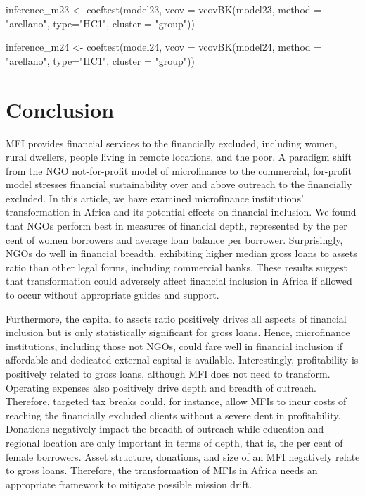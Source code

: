 \documentclass[a4paper,nobind]{templates/ociamthesis}
\newenvironment{Shaded}{\begin{snugshade}}{\end{snugshade}}
\newcommand{\AttributeTok}[1]{\textcolor[rgb]{0.77,0.63,0.00}{#1}}
\newcommand{\FunctionTok}[1]{\textcolor[rgb]{0.00,0.00,0.00}{#1}}
\newcommand{\NormalTok}[1]{#1}
\newcommand{\OtherTok}[1]{\textcolor[rgb]{0.56,0.35,0.01}{#1}}
\newcommand{\StringTok}[1]{\textcolor[rgb]{0.31,0.60,0.02}{#1}}
\renewenvironment{Shaded}
{
  \vspace{10pt}%
  \begin{snugshade}%
}{%
  \end{snugshade}%
  \vspace{8pt}%
}
\begin{document}
\begin{Shaded}
\begin{Highlighting}[]
\NormalTok{inference\_m23 }\OtherTok{\textless{}{-}} \FunctionTok{coeftest}\NormalTok{(model23, }\AttributeTok{vcov =} \FunctionTok{vcovBK}\NormalTok{(model23, }\AttributeTok{method =} \StringTok{"arellano"}\NormalTok{, }\AttributeTok{type=}\StringTok{"HC1"}\NormalTok{, }\AttributeTok{cluster =} \StringTok{"group"}\NormalTok{))}

\NormalTok{inference\_m24 }\OtherTok{\textless{}{-}} \FunctionTok{coeftest}\NormalTok{(model24, }\AttributeTok{vcov =} \FunctionTok{vcovBK}\NormalTok{(model24, }\AttributeTok{method =} \StringTok{"arellano"}\NormalTok{, }\AttributeTok{type=}\StringTok{"HC1"}\NormalTok{, }\AttributeTok{cluster =} \StringTok{"group"}\NormalTok{))}
\end{Highlighting}
\end{Shaded}

\hypertarget{conclusion}{%
\section{\texorpdfstring{\textbf{Conclusion}}{Conclusion}}\label{conclusion}}

MFI provides financial services to the financially excluded, including women, rural dwellers, people living in remote locations, and the poor. A paradigm shift from the NGO not-for-profit model of microfinance to the commercial, for-profit model stresses financial sustainability over and above outreach to the financially excluded. In this article, we have examined microfinance institutions' transformation in Africa and its potential effects on financial inclusion. We found that NGOs perform best in measures of financial depth, represented by the per cent of women borrowers and average loan balance per borrower. Surprisingly, NGOs do well in financial breadth, exhibiting higher median gross loans to assets ratio than other legal forms, including commercial banks. These results suggest that transformation could adversely affect financial inclusion in Africa if allowed to occur without appropriate guides and support.

Furthermore, the capital to assets ratio positively drives all aspects of financial inclusion but is only statistically significant for gross loans. Hence, microfinance institutions, including those not NGOs, could fare well in financial inclusion if affordable and dedicated external capital is available. Interestingly, profitability is positively related to gross loans, although MFI does not need to transform. Operating expenses also positively drive depth and breadth of outreach. Therefore, targeted tax breaks could, for instance, allow MFIs to incur costs of reaching the financially excluded clients without a severe dent in profitability. Donations negatively impact the breadth of outreach while education and regional location are only important in terms of depth, that is, the per cent of female borrowers. Asset structure, donations, and size of an MFI negatively relate to gross loans. Therefore, the transformation of MFIs in Africa needs an appropriate framework to mitigate possible mission drift.
\end{document}
